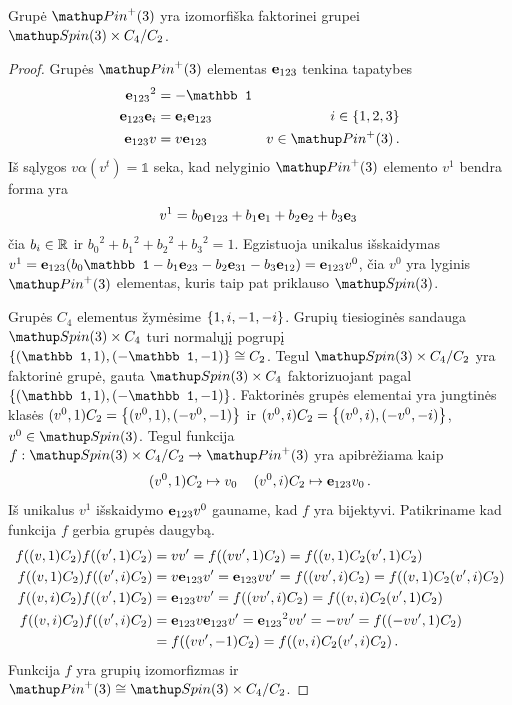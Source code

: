 \begin{proposition}
	Grupė $\pinp$ yra izomorfiška faktorinei grupei $\spin \times C_4 /C_2$.
\end{proposition}
\begin{proof}
	Grupės $\pinp$ elementas $\vb e_{123}$ tenkina tapatybes
	\begin{equation}
		\begin{aligned}
			{\vb e_{123}}^2 &= -\mathbb1
			\\
			\vb e_{123} \vb e_i &= \vb e_i  \vb e_{123} \quad &i \in \qty{1,2,3}
			\\
			\vb e_{123} v &= v  \vb e_{123} \quad &v \in \pinp
			\,.
		\end{aligned}
	\end{equation}
	Iš sąlygos $v\alpha(v^t) = \mathbb1$ seka, kad nelyginio $\pinp$ elemento $v^1$ bendra forma yra
	\begin{equation}
		v^1 = 
		b_0 \vb e_{123}
		+ b_1 \vb e_1
		+ b_2 \vb e_2
		+ b_3 \vb e_3
		\,
	\end{equation}
	čia $b_i \in \mathbb{R}$ ir
	${b_0}^2 + {b_1}^2 + {b_2}^2 + {b_3}^2 = 1$.
	Egzistuoja unikalus išskaidymas
	$ v^1 = \vb e_{123} \qty({
		b_0 \mathbb1
		- b_1 \vb e_{23}
		- b_2 \vb e_{31}
		- b_3 \vb e_{12}
	})= \vb e_{123} v^0 $, čia $v^0$ yra lyginis $\pinp$ elementas,
	kuris taip pat priklauso $\spin$.

	Grupės $C_4$ elementus žymėsime $\qty{1,i,-1,-i}$.
	Grupių tiesioginės sandauga $\spin \times C_4$
	turi normalųjį pogrupį $\qty{(\mathbb1,1),(-\mathbb1,-1)} \cong C_2$.
	Tegul $\spin \times C_4 /C_2$ yra faktorinė grupė, gauta $\spin \times C_4$ faktorizuojant pagal $\qty{(\mathbb1,1),(-\mathbb1,-1)}$.
	Faktorinės grupės elementai yra jungtinės klasės $(v^0,1)C_2 = \qty{(v^0,1),(-v^0,-1)}$ ir $(v^0,i)C_2 = \qty{(v^0,i),(-v^0,-i)}$,
	$v^0 \in \spin$.
	Tegul funkcija $f: \spin \times C_4 /C_2 \to \pinp$ yra apibrėžiama kaip 
	\begin{equation}
		(v^0,1)C_2 \mapsto v_0
		\,\quad
		(v^0,i)C_2 \mapsto \vb e_{123}v_0
		\,.
	\end{equation}
	Iš unikalus $v^1$ išskaidymo $\vb e_{123} v^0$ gauname,
	kad $f$ yra bijektyvi.
	Patikriname kad funkcija $f$ gerbia grupės daugybą.
	\begin{align}
		f((v,1)C_2)f((v',1)C_2) &= vv' = f((vv',1)C_2) = f((v,1)C_2(v',1)C_2)
		\\
		f((v,1)C_2)f((v',i)C_2) &= v\vb e_{123}v' = \vb e_{123}vv' = f((vv', i)C_2) = f((v,1)C_2(v',i)C_2)
		\\
		f((v,i)C_2)f((v',1)C_2) &= \vb e_{123}vv' = f((vv', i)C_2) = f((v,i)C_2(v',1)C_2)
		\\
		f((v,i)C_2)f((v',i)C_2) &= \vb e_{123}v\vb e_{123}v' = {\vb e_{123}}^2 vv' = - vv'= f((-vv', 1)C_2) \nonumber
		\\ &=f ((vv', -1)C_2) = f((v,i)C_2(v',i)C_2)
		\,.
	\end{align}
	Funkcija $f$ yra grupių izomorfizmas ir $\pinp \cong \spin \times C_4/C_2$.
\end{proof}


